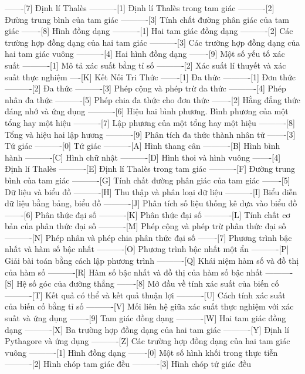 -------[7] Định lí Thalès
----------[1] Định lí Thalès trong tam giác
----------[2] Đường trung bình của tam giác
----------[3] Tính chất đường phân giác của tam giác
-------[8] Hình đồng dạng
----------[1] Hai tam giác đồng dạng
----------[2] Các trường hợp đồng dạng của hai tam giác
----------[3] Các trường hợp đồng dạng của hai tam giác vuông
----------[4] Hai hình đồng dạng
-------[9] Một số yếu tố xác suất
----------[1] Mô tả xác suất bằng tỉ số
----------[2] Xác suất lí thuyết và xác suất thực nghiệm
----[K] Kết Nối Tri Thức
-------[1] Đa thức
----------[1] Đơn thức
----------[2] Đa thức
----------[3] Phép cộng và phép trừ đa thức
----------[4] Phép nhân đa thức
----------[5] Phép chia đa thức cho đơn thức
-------[2] Hằng đẳng thức đáng nhớ và ứng dụng
----------[6] Hiệu hai bình phương. Bình phương của một tổng hay một hiệu
----------[7] Lập phương của một tổng hay một hiệu
----------[8] Tổng và hiệu hai lập hương
----------[9] Phân tích đa thức thành nhân tử
-------[3] Tứ giác
----------[0] Tứ giác
----------[A] Hình thang cân
----------[B] Hình bình hành
----------[C] Hình chữ nhật
----------[D] Hình thoi và hình vuông
-------[4] Định lí Thalès
----------[E] Định lí Thalès trong tam giác
----------[F] Đường trung bình của tam giác
----------[G] Tính chất đường phân giác của tam giác
-------[5] Dữ liệu và biểu đồ
----------[H] Thu thập và phân loại dữ liệu
----------[I] Biểu diễn dữ liệu bằng bảng, biểu đồ
----------[J] Phân tích số liệu thống kê dựa vào biểu đồ
-------[6] Phân thức đại số
----------[K] Phân thức đại số
----------[L] Tính chất cơ bản của phân thức đại số
----------[M] Phép cộng và phép trừ phân thức đại số
----------[N] Phép nhân và phép chia phân thức đại số
-------[7] Phương trình bậc nhất và hàm số bậc nhất
----------[O] Phương trình bậc nhất một ẩn
----------[P] Giải bài toán bằng cách lập phương trình
----------[Q] Khái niệm hàm số và đồ thị của hàm số
----------[R] Hàm số bậc nhất và đồ thị của hàm số bậc nhất
----------[S] Hệ số góc của đường thẳng
-------[8] Mở đầu về tính xác suất của biến cố
----------[T] Kết quả có thể và kết quả thuận lợi
----------[U] Cách tính xác suất của biến cố bằng tỉ số
----------[V] Mối liên hệ giữa xác suất thực nghiệm với xác suất và ứng dụng
-------[9] Tam giác đồng dạng
----------[W] Hai tam giác đồng dạng
----------[X] Ba trường hợp đồng dạng của hai tam giác
----------[Y] Định lí Pythagore và ứng dụng
----------[Z] Các trường hợp đồng dạng của hai tam giác vuông
----------[1] Hình đồng dạng
-------[0] Một số hình khối trong thực tiễn
----------[2] Hình chóp tam giác đều
----------[3] Hình chóp tứ giác đều
